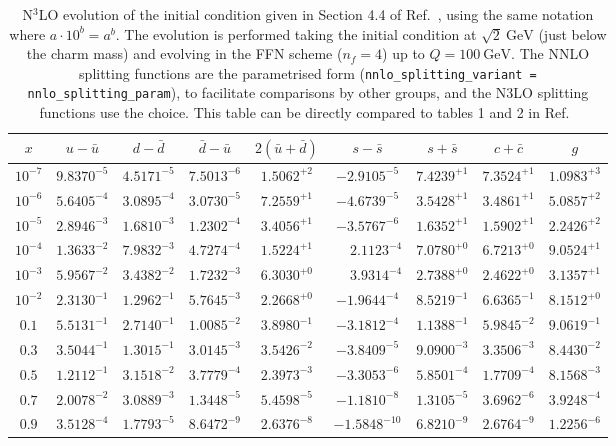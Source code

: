 \begin{table}
  \small \centering
  \begin{tabular}{c|cccccccc}
    $x$ &  $u-\bar u$ &$d-\bar d$ &$\bar d-\bar u$ &  $ 2(\bar u+\bar d)$  &$s-\bar s$ &$s+\bar s$&$c+\bar c$ &   $g$\\
    \toprule
$10^{-7}$ &  $9.8370^{-5}$ &  $4.5171^{-5}$ &  $7.5013^{-6}$ &  $1.5062^{+2}$ &  $-2.9105^{-5}$ &   $7.4239^{+1}$ &  $7.3524^{+1}$ &  $1.0983^{+3}$ \\
$10^{-6}$ &  $5.6405^{-4}$ &  $3.0895^{-4}$ &  $3.0730^{-5}$ &  $7.2559^{+1}$ &  $-4.6739^{-5}$ &   $3.5428^{+1}$ &  $3.4861^{+1}$ &  $5.0857^{+2}$ \\
$10^{-5}$ &  $2.8946^{-3}$ &  $1.6810^{-3}$ &  $1.2302^{-4}$ &  $3.4056^{+1}$ &  $-3.5767^{-6}$ &   $1.6352^{+1}$ &  $1.5902^{+1}$ &  $2.2426^{+2}$ \\
$10^{-4}$ &  $1.3633^{-2}$ &  $7.9832^{-3}$ &  $4.7274^{-4}$ &  $1.5224^{+1}$ &  $\phantom{-}2.1123^{-4}$ &   $7.0780^{+0}$ &  $6.7213^{+0}$ &  $9.0524^{+1}$ \\
$10^{-3}$ &  $5.9567^{-2}$ &  $3.4382^{-2}$ &  $1.7232^{-3}$ &  $6.3030^{+0}$ &  $\phantom{-}3.9314^{-4}$ &   $2.7388^{+0}$ &  $2.4622^{+0}$ &  $3.1357^{+1}$ \\
$10^{-2}$ &  $2.3130^{-1}$ &  $1.2962^{-1}$ &  $5.7645^{-3}$ &  $2.2668^{+0}$ &  $-1.9644^{-4}$ &   $8.5219^{-1}$ &  $6.6365^{-1}$ &  $8.1512^{+0}$ \\
$0.1$    &  $5.5131^{-1}$ &  $2.7140^{-1}$ &  $1.0085^{-2}$ &  $3.8980^{-1}$ &  $-3.1812^{-4}$ &   $1.1388^{-1}$ &  $5.9845^{-2}$ &  $9.0619^{-1}$ \\
$0.3$    &  $3.5044^{-1}$ &  $1.3015^{-1}$ &  $3.0145^{-3}$ &  $3.5426^{-2}$ &  $-3.8409^{-5}$ &   $9.0900^{-3}$ &  $3.3506^{-3}$ &  $8.4430^{-2}$ \\
$0.5$    &  $1.2112^{-1}$ &  $3.1518^{-2}$ &  $3.7779^{-4}$ &  $2.3973^{-3}$ &  $-3.3053^{-6}$ &   $5.8501^{-4}$ &  $1.7709^{-4}$ &  $8.1568^{-3}$ \\
$0.7$    &  $2.0078^{-2}$ &  $3.0889^{-3}$ &  $1.3448^{-5}$ &  $5.4598^{-5}$ &  $-1.1810^{-8}$ &   $1.3105^{-5}$ &  $3.6962^{-6}$ &  $3.9248^{-4}$ \\
$0.9$    &  $3.5128^{-4}$ &  $1.7793^{-5}$ &  $8.6472^{-9}$ &  $2.6376^{-8}$ &  $-1.5848^{-10}$ &  $6.8210^{-9}$ &  $2.6764^{-9}$ &  $1.2256^{-6}$ 
  \end{tabular}
  \caption{N$^3$LO evolution of the initial condition given in Section
    4.4 of Ref.~\cite{Dittmar:2005ed}, using the same notation where
    $a\cdot10^{b} = a^b$. The evolution is performed taking the
    initial condition at $\sqrt{2}~\text{GeV}$ (just below the charm
    mass) and evolving in the FFN scheme ($n_f = 4$) up to
    $Q=100~\text{GeV}$.
    The NNLO splitting functions are the parametrised form
    (\texttt{nnlo\_splitting\_variant = nnlo\_splitting\_param}), to 
    facilitate comparisons by other groups, and the N3LO splitting
    functions use the
     choice. This table can be directly compared to tables 1 and 2 in Ref.~\cite{Cooper-Sarkar:2024crx}}
  \label{tab:n3lo-evolve-nf4}
\end{table}

